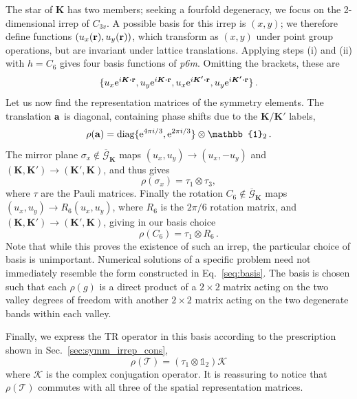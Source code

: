 The star of $\boldsymbol{K}$ has two members; seeking a fourfold degeneracy, we focus on the 2-dimensional irrep of $C_{3v}$. A possible basis for this irrep is $(x,y)$;  we therefore define functions $(u_x(\vb{r}), u_y(\vb{r}))$, which transform as $(x,y)$ under point group operations, but are invariant under lattice translations. Applying steps (i) and (ii) with $h = C_6$ gives four basis functions of \textit{p6m}. Omitting the brackets, these are
%
\begin{equation} \label{seq:basis}
\{ u_x \e^{i \boldsymbol{K} \vdot \vb{r}}, u_y \e^{i \boldsymbol{K} \vdot \vb{r}}, u_x \e^{i \boldsymbol{K'} \vdot \vb{r}}, u_y \e^{i \boldsymbol{K'} \vdot \vb{r}} \} \,.
\end{equation}
%
Let us now find the representation matrices of the symmetry elements. The translation $\vb{a}$ is diagonal, containing phase shifts due to the $\boldsymbol{K}/\boldsymbol{K'}$ labels,
%
\begin{equation}
\rho(\vb{a}) = \text{diag}\{ \e^{4 \pi i /3}, \e^{2 \pi i /3}  \} \otimes \mathbb{1}_2\,.
\end{equation}
%
The mirror plane $\sigma_x \notin \overline{\mathcal{G}}_{\boldsymbol{K}}$ maps $(u_x,u_y) \rightarrow (u_x, -u_y)$ and $(\boldsymbol{K}, \boldsymbol{K}') \rightarrow (\boldsymbol{K}', \boldsymbol{K})$, and thus gives
%
\begin{equation}
\rho(\sigma_x) = \tau_1 \otimes \tau_3,
\end{equation}
%
where $\tau$ are the Pauli matrices.
Finally the rotation $C_6 \notin \overline{\mathcal{G}}_{\boldsymbol{K}}$ maps $(u_x, u_y) \rightarrow R_6 (u_x,u_y)$, where $R_6$ is the $2\pi/6$ rotation matrix, and $(\boldsymbol{K}, \boldsymbol{K}') \rightarrow (\boldsymbol{K}', \boldsymbol{K})$, giving in our basis choice
\begin{equation}
\rho(C_6) = \tau_1 \otimes R_6\,.
\end{equation}
Note that while this proves the existence of such an irrep, the particular choice of basis is unimportant. Numerical solutions of a specific problem need not immediately resemble the form constructed in Eq.~\eqref{seq:basis}. The basis is chosen such that each $\rho(g)$ is a direct product of a $2 \times 2$ matrix acting on the two valley degrees of freedom with another $2 \times 2$ matrix acting on the two degenerate bands within each valley.

Finally, we express the TR operator in this basis according to the prescription shown in Sec.~\ref{sec:symm_irrep_cons},
\begin{equation}
\rho(\mathcal{T}) = (\tau_1 \otimes \mathbb{1}_2) \mathcal{K}
\end{equation}
where $\mathcal{K}$ is the complex conjugation operator. It is reassuring to notice that $\rho(\mathcal{T})$ commutes with all three of the spatial representation matrices. 

